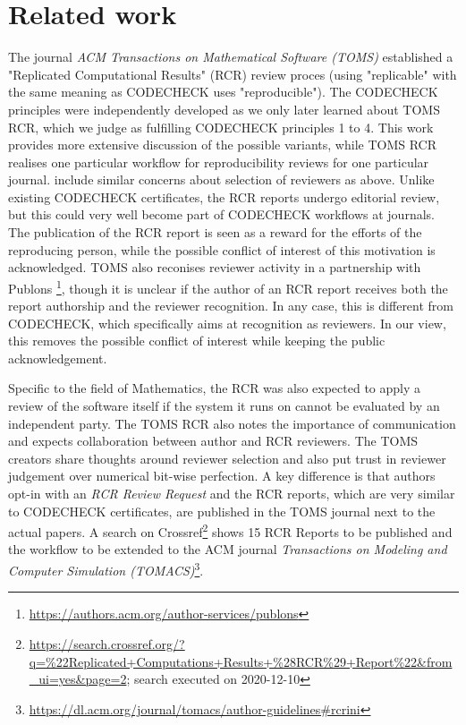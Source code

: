 \documentclass[12pt]{article}
\begin{document}
\section*{Related work}\label{related-work}

The journal \emph{ACM Transactions on Mathematical Software (TOMS)} 
established a "Replicated Computational Results" (RCR) review proces
\cite{heroux_editorial_2015} (using "replicable" with the same meaning 
as CODECHECK uses "reproducible").
The CODECHECK principles were independently developed as we only later 
learned about TOMS RCR, which we judge as fulfilling CODECHECK principles
1 to 4.
This work provides more extensive discussion of the possible variants, 
while TOMS RCR realises one particular workflow for reproducibility 
reviews for one particular journal. \cite{heroux_editorial_2015}
include similar concerns about
selection of reviewers as above. Unlike existing CODECHECK certificates, 
the RCR reports undergo editorial review, but this could very well become
part of CODECHECK workflows at journals.
The publication of the RCR report is seen as a reward for the efforts of
the reproducing person, while the possible conflict of interest of this 
motivation is acknowledged. TOMS also reconises reviewer activity in a 
partnership with Publons
\footnote{\url{https://authors.acm.org/author-services/publons}},
though it is unclear if the author of an RCR report receives both the report
authorship and the reviewer recognition. In any case, this is different
from CODECHECK, which specifically aims at recognition as reviewers.
In our view, this removes the possible conflict of interest while keeping
the public acknowledgement.

Specific to the field of Mathematics, the RCR was also  expected to apply a
review of the software itself if the system it runs on cannot be evaluated by
an independent party.
The TOMS RCR also notes the importance of communication and expects
collaboration between author and RCR reviewers.
The TOMS creators share thoughts around reviewer selection and also put trust
in reviewer judgement over numerical bit-wise perfection.
A key difference is that authors opt-in with an \emph{RCR Review Request} and
the RCR reports, which are very similar to CODECHECK certificates, are
published in the TOMS journal next to the actual papers.
A search on Crossref\footnote{\url{https://search.crossref.org/?q=\%22Replicated+Computations+Results+\%28RCR\%29+Report\%22&from_ui=yes&page=2}; search executed
on 2020-12-10} shows 15 RCR Reports to be published and the workflow to be 
extended to the ACM journal \emph{Transactions on Modeling and Computer 
Simulation (TOMACS)}\footnote{\url{https://dl.acm.org/journal/tomacs/author-guidelines#rcrini}}.
\end{document}
